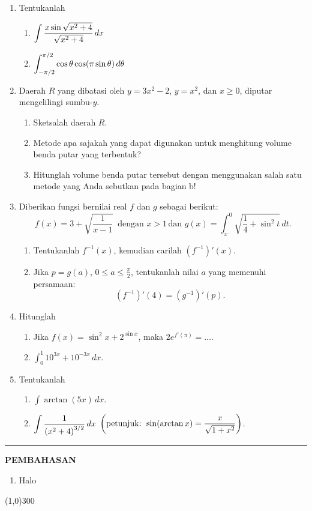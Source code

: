 \begin{enumerate}[leftmargin=*, label={\arabic*}.]
\item Tentukanlah
\begin{enumerate}[label={\alph*}.]
    \item $\ds\int \frac{x\sin\sqrt{x^{2}+4}}{\sqrt{x^{2}+4}}\, dx$
    \item $\ds\int_{-\pi/2}^{\pi/2} \cos\theta\cos\brk*{\pi\sin\theta}\,d\theta$
\end{enumerate}
\item Daerah $R$ yang dibatasi oleh $y=3x^{2}-2$, $y=x^{2}$, dan $x\geq 0$, diputar 
mengelilingi sumbu-$y$.
\begin{enumerate}[label={\alph*}.]
    \item Sketsalah daerah $R$.
    \item Metode apa sajakah yang dapat digunakan untuk menghitung volume benda putar 
    yang terbentuk?
    \item Hitunglah volume benda putar tersebut dengan menggunakan salah satu metode yang 
    Anda sebutkan pada bagian b!
\end{enumerate}
\item Diberikan fungsi bernilai real $f$ dan $g$ sebagai berikut:
\[
f(x)=3+\sqrt{\frac{1}{x-1}}\,\text{ dengan }x > 1\,\text{dan }g(x)=
\int_{x}^{0}\sqrt{\frac{1}{4}+\sin^{2}t}\,dt.
\]
\begin{enumerate}[label={\alph*}.]
    \item Tentukanlah $f^{-1}(x)$, kemudian carilah $(f^{-1})'(x)$.
    \item Jika $p=g(a)$, $0\leq a \leq \frac{\pi}{2}$, tentukanlah nilai $a$ 
    yang memenuhi persamaan:
    \[
    (f^{-1})'(4)=(g^{-1})'(p).
    \]
\end{enumerate}
\item Hitunglah
\begin{enumerate}[label={\alph*}.]
    \item Jika $f(x)=\sin^{2}x+2^{\sin x}$, maka $2e^{f'(\pi)}=\dots$.
    \item $\int_{0}^{1} 10^{3x}+10^{-3x}\,dx$.
\end{enumerate}
\item Tentukanlah
\begin{enumerate}[label={\alph*}.]
    \item $\int \arctan(5x)\,dx$.
    \item $\ds \int \frac{1}{\brk*{x^{2}+4}^{3/2}}\,dx$ 
    $\ds\brk*{\text{petunjuk: } \sin(\arctan x) = \frac{x}{\sqrt{1+x^{2}}}}$.
\end{enumerate}
\end{enumerate}
\vspace{0.2cm}
\hrule height 1pt
\vspace{0.5cm}
\begin{center}
    \textbf{\large{PEMBAHASAN}}
\end{center}
\begin{enumerate}[leftmargin=*, label={\arabic*}.]
\item Halo
\end{enumerate}

\begin{center}
    \line(1,0){300}
\end{center}
